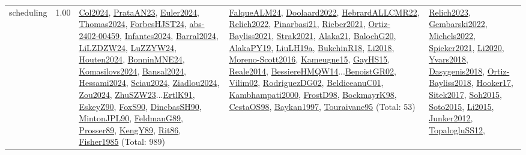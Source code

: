 {\begin{longtable}{p{3cm}r>{\raggedright\arraybackslash}p{6cm}>{\raggedright\arraybackslash}p{6cm}>{\raggedright\arraybackslash}p{8cm}}
\index{scheduling}\index{Scheduling!scheduling}scheduling &  1.00 & \hyperref[detail:Col2024]{Col2024}, \hyperref[detail:PrataAN23]{PrataAN23}, \hyperref[detail:Euler2024]{Euler2024}, \hyperref[detail:Thomas2024]{Thomas2024}, \hyperref[detail:ForbesHJST24]{ForbesHJST24}, \hyperref[detail:abs-2402-00459]{abs-2402-00459}, \hyperref[detail:Infantes2024]{Infantes2024}, \hyperref[detail:Barral2024]{Barral2024}, \hyperref[detail:LiLZDZW24]{LiLZDZW24}, \hyperref[detail:LuZZYW24]{LuZZYW24}, \hyperref[detail:Houten2024]{Houten2024}, \hyperref[detail:BonninMNE24]{BonninMNE24}, \hyperref[detail:Komasilovs2024]{Komasilovs2024}, \hyperref[detail:Bansal2024]{Bansal2024}, \hyperref[detail:Hessami2024]{Hessami2024}, \hyperref[detail:Sciau2024]{Sciau2024}, \hyperref[detail:Ziadlou2024]{Ziadlou2024}, \hyperref[detail:Zou2024]{Zou2024}, \hyperref[detail:ZhuSZW23]{ZhuSZW23}...\hyperref[detail:ErtlK91]{ErtlK91}, \hyperref[detail:EskeyZ90]{EskeyZ90}, \hyperref[detail:FoxS90]{FoxS90}, \hyperref[detail:DincbasSH90]{DincbasSH90}, \hyperref[detail:MintonJPL90]{MintonJPL90}, \hyperref[detail:FeldmanG89]{FeldmanG89}, \hyperref[detail:Prosser89]{Prosser89}, \hyperref[detail:KengY89]{KengY89}, \hyperref[detail:Rit86]{Rit86}, \hyperref[detail:Fisher1985]{Fisher1985} (Total: 989) & \hyperref[detail:FalqueALM24]{FalqueALM24}, \hyperref[detail:Doolaard2022]{Doolaard2022}, \hyperref[detail:HebrardALLCMR22]{HebrardALLCMR22}, \hyperref[detail:Relich2022]{Relich2022}, \hyperref[detail:Pinarbasi21]{Pinarbasi21}, \hyperref[detail:Rieber2021]{Rieber2021}, \hyperref[detail:Ortiz-Bayliss2021]{Ortiz-Bayliss2021}, \hyperref[detail:Strak2021]{Strak2021}, \hyperref[detail:Alaka21]{Alaka21}, \hyperref[detail:BalochG20]{BalochG20}, \hyperref[detail:AlakaPY19]{AlakaPY19}, \hyperref[detail:LiuLH19a]{LiuLH19a}, \hyperref[detail:BukchinR18]{BukchinR18}, \hyperref[detail:Li2018]{Li2018}, \hyperref[detail:Moreno-Scott2016]{Moreno-Scott2016}, \hyperref[detail:Kameugne15]{Kameugne15}, \hyperref[detail:GayHS15]{GayHS15}, \hyperref[detail:Reale2014]{Reale2014}, \hyperref[detail:BessiereHMQW14]{BessiereHMQW14}...\hyperref[detail:BenoistGR02]{BenoistGR02}, \hyperref[detail:Vilim02]{Vilim02}, \hyperref[detail:RodriguezDG02]{RodriguezDG02}, \hyperref[detail:BeldiceanuC01]{BeldiceanuC01}, \hyperref[detail:Kambhampati2000]{Kambhampati2000}, \hyperref[detail:FrostD98]{FrostD98}, \hyperref[detail:BockmayrK98]{BockmayrK98}, \hyperref[detail:CestaOS98]{CestaOS98}, \hyperref[detail:Baykan1997]{Baykan1997}, \hyperref[detail:Touraivane95]{Touraivane95} (Total: 53) & \hyperref[detail:Relich2023]{Relich2023}, \hyperref[detail:Gembarski2022]{Gembarski2022}, \hyperref[detail:Michels2022]{Michels2022}, \hyperref[detail:Spieker2021]{Spieker2021}, \hyperref[detail:Li2020]{Li2020}, \hyperref[detail:Yvars2018]{Yvars2018}, \hyperref[detail:Dasygenis2018]{Dasygenis2018}, \hyperref[detail:Ortiz-Bayliss2018]{Ortiz-Bayliss2018}, \hyperref[detail:Hooker17]{Hooker17}, \hyperref[detail:Sitek2017]{Sitek2017}, \hyperref[detail:Soh2015]{Soh2015}, \hyperref[detail:Soto2015]{Soto2015}, \hyperref[detail:Li2015]{Li2015}, \hyperref[detail:Junker2012]{Junker2012}, \hyperref[detail:TopalogluSS12]{TopalogluSS12}, 
\end{longtable}}
